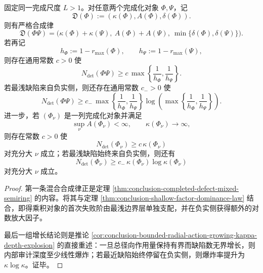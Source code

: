 \begin{theorem}[缺陷三元组与首次失败阶的热带主宰律]\label{thm:conclusion-toeplitz-cmv-defect-tropical-audit-dominance}
固定同一完成尺度 \(L>1\)。对任意两个完成化对象 \(\Phi,\Psi\)，记
\[
\mathfrak D(\Phi):=(\kappa(\Phi),A(\Phi),\delta(\Phi)).
\]
则有严格合成律
\[
\mathfrak D(\Phi\Psi)
=
\bigl(
\kappa(\Phi)+\kappa(\Psi),\
A(\Phi)+A(\Psi),\
\min\{\delta(\Phi),\delta(\Psi)\}
\bigr).
\]
若再记
\[
h_\Phi:=1-r_{\max}(\Phi),
\qquad
h_\Psi:=1-r_{\max}(\Psi),
\]
则存在通用常数 \(c>0\) 使
\[
N_{\det}(\Phi\Psi)\ge
c\,
\max\!\left\{
\frac1{h_\Phi},\frac1{h_\Psi}
\right\}.
\]
若最浅缺陷来自负实侧，则还存在通用常数 \(c_->0\) 使
\[
N_{\det}(\Phi\Psi)\ge
c_-\,
\max\!\left\{
\frac1{h_\Phi},\frac1{h_\Psi}
\right\}
\log\!\left(
\max\!\left\{
\frac1{h_\Phi},\frac1{h_\Psi}
\right\}
\right).
\]
进一步，若 \((\Phi_\nu)\) 是一列完成化对象并满足
\[
\sup_\nu A(\Phi_\nu)<\infty,
\qquad
\kappa(\Phi_\nu)\to\infty,
\]
则存在常数 \(c>0\) 使
\[
N_{\det}(\Phi_\nu)\ge c\,\kappa(\Phi_\nu)
\]
对充分大 \(\nu\) 成立；若最浅缺陷始终来自负实侧，则还有
\[
N_{\det}(\Phi_\nu)\ge c_-\,\kappa(\Phi_\nu)\log\kappa(\Phi_\nu)
\]
对充分大 \(\nu\) 成立。
\end{theorem}
\begin{proof}
第一条混合合成律正是定理 \ref{thm:conclusion-completed-defect-mixed-semiring} 的内容。将其与定理 \ref{thm:conclusion-shallow-factor-dominance-law} 结合，即得乘积对象的首次失败阶由最浅边界层单独支配，并在负实侧获得额外的对数放大因子。

最后一组增长结论则是推论 \ref{cor:conclusion-bounded-radial-action-growing-kappa-depth-explosion} 的直接重述：一旦总径向作用量保持有界而缺陷数无界增长，则内部审计深度至少线性爆炸；若最近缺陷始终停留在负实侧，则爆炸率提升为 \(\kappa\log\kappa\)。证毕。
\end{proof}

